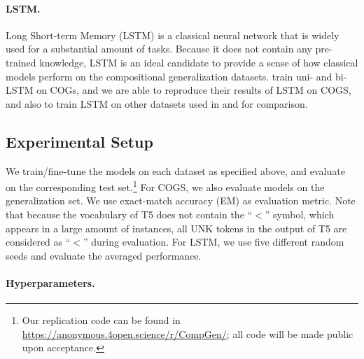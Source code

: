 \vspace{-3mm}
\paragraph{LSTM.}
Long Short-term Memory (LSTM) is a classical neural network that is widely used for a substantial amount of tasks. 
Because it does not contain any pre-trained knowledge, LSTM is an ideal candidate to provide a sense of how classical models perform on the compositional generalization datasets. \citet{kim-linzen-2020-cogs} train uni- and bi-LSTM on COGs, and we are able to reproduce their results of LSTM on COGS, and also to train LSTM on other datasets used in \cite{shaw-etal-2021-compositional} and \cite{kim2021sequencetosequence} for comparison.

\subsection{Experimental Setup}
We train/fine-tune the models on each dataset as specified above, and evaluate on the corresponding test set.\footnote{Our replication code can be found in \url{https://anonymous.4open.science/r/CompGen/}; all code will be made public upon acceptance.}
For COGS, we also evaluate models on the generalization set.
We use exact-match accuracy (EM) as evaluation metric. 
Note that because the vocabulary of T5 does not contain the ``$<$'' symbol, which appears in a large amount of instances, all UNK tokens in the output of T5 are considered as ``$<$'' during evaluation. For LSTM, we use five different random seeds and evaluate the averaged performance.

\vspace{-3mm}
\paragraph{Hyperparameters.}

